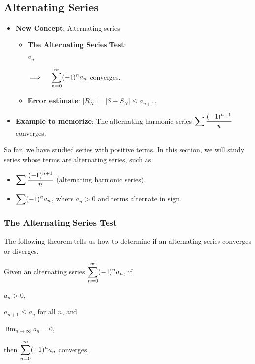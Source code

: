 \subsection{Alternating Series} 
\begin{center}
\begin{tcolorbox}
    \begin{itemize}
        \item \textbf{New Concept}: Alternating series
        \begin{itemize}
        \item \textbf{The Alternating Series Test}: 
        
        $a_n$ 
        $\implies \quad \displaystyle\sum_{n=0}^\infty (-1)^n a_n$ converges.
        \item \textbf{Error estimate}: $|R_N| = |S - S_N| \leq a_{n+1}$.
        \end{itemize}
        
        \item \textbf{Example to memorize}: The alternating harmonic series $\displaystyle\sum \dfrac{(-1)^{n+1}}{n}$ converges.
    \end{itemize}
\end{tcolorbox}
\end{center}
So far, we have studied series with positive terms. In this section, we will study series whose terms are alternating series, such as
\begin{itemize}
    \item $\displaystyle\sum \dfrac{(-1)^{n+1}}{n}$ (alternating harmonic series).
    \item $\displaystyle\sum (-1)^{n} a_n$, where $a_n > 0$ and terms alternate in sign.
\end{itemize}

\subsubsection{The Alternating Series Test}
The following theorem tells us how to determine if an alternating series converges or diverges.

\begin{thm}
    Given an alternating series $\displaystyle\sum_{n=0}^\infty (-1)^n a_n$, if 
    
    \begin{center}
    \begin{enumerate*}[label = \circled{\arabic*}]
        \item $a_n > 0$, 
        \item $a_{n+1} \leq a_n$ for all $n$, and 
        \item $\lim_{n \to \infty} a_n = 0$,
    \end{enumerate*}
    \end{center}
    
    then $\displaystyle\sum_{n=0}^\infty (-1)^n a_n$ converges.
\end{thm}

